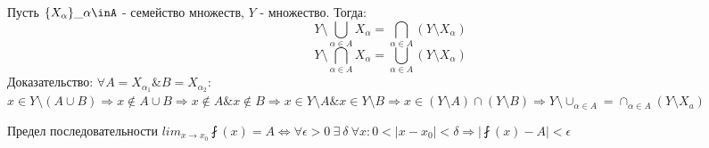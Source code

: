 \documentclass{article}
\begin{document}
Пусть $\{X_{\alpha}\}\_\alpha\inA$ - семейство множеств, $Y$ - множество. Тогда:
\[ Y \setminus \bigcup_{\alpha\in A} X_{\alpha} = \bigcap_{\alpha\in A}(Y\setminus X_{\alpha})\]
\[ Y \setminus \bigcap_{\alpha\in A} X_{\alpha} = \bigcup_{\alpha\in A}(Y\setminus X_{\alpha})\]
Доказательство:
$\forall A = X_{\alpha_1}\& B = X _ {\alpha _ 2}$:
$x \in Y \setminus (A \cup B) \Rightarrow x \notin A \cup B \Rightarrow x \notin A \& x \notin B \Rightarrow x \in Y \setminus A \& x \in Y \setminus B \Rightarrow x \in (Y\setminus A) \cap (Y \setminus B) \Rightarrow Y\setminus \cup_{\alpha \in A} = \cap_{\alpha \in A}(Y \setminus X_a)$

Предел последовательности
${lim}_{x\rightarrow x_0} \fint(x)=A \Leftrightarrow \forall \epsilon > 0~\exists~\delta~\forall x: 0<|x-x_0|<\delta \Rightarrow |\fint (x) - A| < \epsilon$
\end{document}
